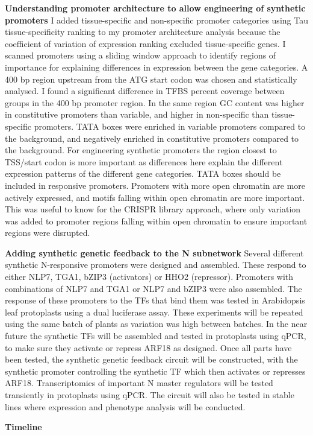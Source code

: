 \documentclass[../main.tex]{subfiles}
\begin{document}
\textbf{Understanding promoter architecture to allow engineering of synthetic promoters}
I added tissue-specific and non-specific promoter categories using Tau tissue-specificity ranking to my promoter architecture analysis because the coefficient of variation of expression ranking excluded tissue-specific genes. I scanned promoters using a sliding window approach to identify regions of importance for explaining differences in expression between the gene categories. A 400 bp region upstream from the ATG start codon was chosen and statistically analysed. I found a significant difference in TFBS percent coverage between groups in the 400 bp promoter region. In the same region GC content was higher in constitutive promoters than variable, and higher in non-specific than tissue-specific promoters. TATA boxes were enriched in variable promoters compared to the background, and negatively enriched in constitutive promoters compared to the background.
For engineering synthetic promoters the region closest to TSS/start codon is more important as differences here explain the different expression patterns of the different gene categories. TATA boxes should be included in responsive promoters. Promoters with more open chromatin are more actively expressed, and motifs falling within open chromatin are more important. This was useful to know for the CRISPR library approach, where only variation was added to promoter regions falling within open chromatin to ensure important regions were disrupted.

\textbf{Adding synthetic genetic feedback to the N subnetwork}
Several different synthetic N-responsive promoters were designed and assembled. These respond to either NLP7, TGA1, bZIP3 (activators) or HHO2 (repressor). Promoters with combinations of NLP7 and TGA1 or NLP7 and bZIP3 were also assembled. The response of these promoters to the TFs that bind them was tested in Arabidopsis leaf protoplasts using a dual luciferase assay. These experiments will be repeated using the same batch of plants as variation was high between batches. In the near future the synthetic TFs will be assembled and tested in protoplasts using qPCR, to make sure they activate or repress ARF18 as designed. Once all parts have been tested, the synthetic genetic feedback circuit will be constructed, with the synthetic promoter controlling the synthetic TF which then activates or represses ARF18. Transcriptomics of important N master regulators will be tested transiently in protoplasts using qPCR. The circuit will also be tested in stable lines where expression and phenotype analysis will be conducted.

\textbf{Timeline}
\end{document}
